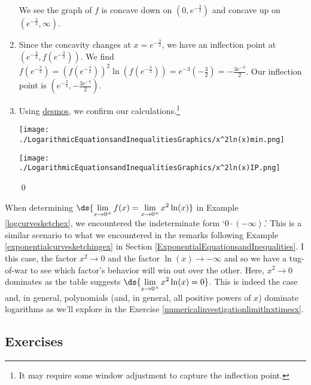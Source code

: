 \documentclass{ximera}
\begin{document}
\begin{example}
\begin{enumerate}
\begin{center}
\begin{multicols}{2}
\end{multicols}
\end{center}

We see the graph of $f$ is concave down on $\left(0, e^{-\frac{3}{2}} \right)$ and concave up on $\left(e^{-\frac{3}{2}} , \infty \right)$.


\item  Since the concavity changes at $x = e^{-\frac{3}{2}}$, we have an inflection point at $\left( e^{-\frac{3}{2}}, f \left(e^{-\frac{3}{2}}\right) \right)$.  We find $f \left(e^{-\frac{3}{2}}\right)  = \left(f \left(e^{-\frac{3}{2}}\right) \right)^2 \ln \left(f \left(e^{-\frac{3}{2}}\right) \right) = e^{-3} \left(-\frac{3}{2} \right) = -\frac{3e^{-3}}{2}$.  Our inflection point is $\left( e^{-\frac{3}{2}},  -\frac{3e^{-3}}{2} \right)$.

\item  Using  \href{https://www.desmos.com/calculator}{\underline{desmos}}, we confirm our calculations.\footnote{It may require some window adjustment to capture the inflection point.}

\begin{center}

\begin{multicols}{2}

\texttt{[image: ./LogarithmicEquationsandInequalitiesGraphics/x^2ln(x)min.png]}

\texttt{[image: ./LogarithmicEquationsandInequalitiesGraphics/x^2ln(x)IP.png]} \\

\end{multicols}

\end{center}

\hfill \qed

\end{enumerate}

\end{example}

When determining $\ds{\lim_{x \rightarrow 0^{+}} f(x)  = \lim_{x \rightarrow 0^{+}} x^2 \ln(x) }$ in Example \ref{logcurvesketchex}, we encountered the indeterminate form `$0 \cdot (-\infty)$.'  This is a similar scenario to what we encountered in the remarks following Example \ref{exponentialcurvesketchingex} in Section \ref{ExponentialEquationsandInequalities}.  I this case, the factor $x^2 \rightarrow 0$ and the factor $\ln(x) \rightarrow -\infty$ and so we have a tug-of-war to see which factor's behavior will win out over the other.  Here, $x^2 \rightarrow 0$ dominates as the table suggests $\ds{\lim_{x \rightarrow 0^{+}} x^2 \ln(x) = 0}$.  This is indeed the case and, in general, polynomials (and, in general, all positive powers of $x$) dominate logarithms as we'll explore in the Exercise \ref{numericalinvestigationlimitlnxtimesx}.  

\newpage

\subsection{Exercises}


\closegraphsfile
\end{document}
